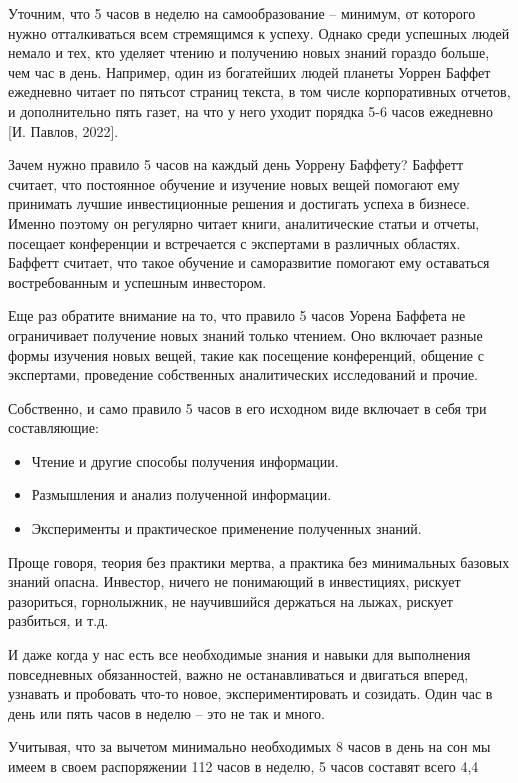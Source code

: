 Уточним, что 5 часов в неделю на самообразование – минимум, от которого нужно отталкиваться всем стремящимся к успеху. Однако среди успешных людей немало и тех, кто уделяет чтению и получению новых знаний гораздо больше, чем час в день. Например, один из богатейших людей планеты Уоррен Баффет ежедневно читает по пятьсот страниц текста, в том числе корпоративных отчетов, и дополнительно пять газет, на что у него уходит порядка 5-6 часов ежедневно [И. Павлов, 2022].

Зачем нужно правило 5 часов на каждый день Уоррену Баффету? Баффетт считает, что постоянное обучение и изучение новых вещей помогают ему принимать лучшие инвестиционные решения и достигать успеха в бизнесе. Именно поэтому он регулярно читает книги, аналитические статьи и отчеты, посещает конференции и встречается с экспертами в различных областях. Баффетт считает, что такое обучение и саморазвитие помогают ему оставаться востребованным и успешным инвестором.

Еще раз обратите внимание на то, что правило 5 часов Уорена Баффета не ограничивает получение новых знаний только чтением. Оно включает разные формы изучения новых вещей, такие как посещение конференций, общение с экспертами, проведение собственных аналитических исследований и прочие.

Собственно, и само правило 5 часов в его исходном виде включает в себя три составляющие:
\begin{itemize}[noitemsep, label=--]
    \item Чтение и другие способы получения информации.
    \item Размышления и анализ полученной информации.
    \item Эксперименты и практическое применение полученных знаний.
\end{itemize}

Проще говоря, теория без практики мертва, а практика без минимальных базовых знаний опасна. Инвестор, ничего не понимающий в инвестициях, рискует разориться, горнолыжник, не научившийся держаться на лыжах, рискует разбиться, и т.д.

И даже когда у нас есть все необходимые знания и навыки для выполнения повседневных обязанностей, важно не останавливаться и двигаться вперед, узнавать и пробовать что-то новое, экспериментировать и созидать. Один час в день или пять часов в неделю – это не так и много.

Учитывая, что за вычетом минимально необходимых 8 часов в день на сон мы имеем в своем распоряжении 112 часов в неделю, 5 часов составят всего 4,4%

